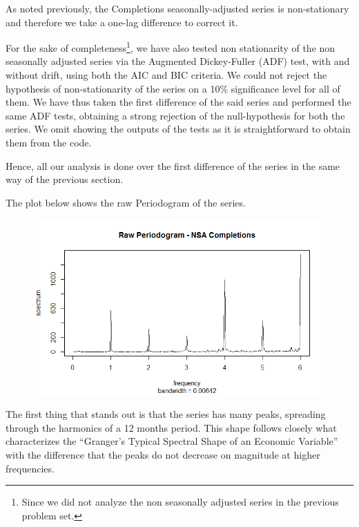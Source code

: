 \documentclass[12pt]{article} %
\begin{document}
As noted previously, the Completions seasonally-adjusted series is non-stationary and therefore we take a one-lag difference to correct it. 

For the sake of completeness\footnote{Since we did not analyze the non seasonally adjusted series in the previous problem set.}, we have also tested non stationarity of the non seasonally adjusted series via the Augmented Dickey-Fuller (ADF) test, with and without drift, using both the AIC and BIC criteria. We could not reject the hypothesis of non-stationarity of the series on a 10\% significance level for all of them. We have thus taken the first difference of the said series and performed the same ADF tests, obtaining a strong rejection of the null-hypothesis for both the series. We omit showing the outputs of the tests as it is straightforward to obtain them from the code.

 Hence, all our analysis is done over the first difference of the series in the same way of the previous section.

The plot below shows the raw Periodogram of the series. 

\newpage

\begin{figure}[h!]
\begin{center}
\includegraphics[scale=0.55]{speccompNSA}
\caption{}
\end{center}
\end{figure}


The first thing that stands out is that the series has many peaks, spreading through the harmonics of a 12 months period. This shape follows closely what characterizes the ``Granger's Typical Spectral Shape of an Economic Variable'' \citep{granger66} with the difference that the peaks do not decrease on magnitude at higher frequencies. 
\end{document}
